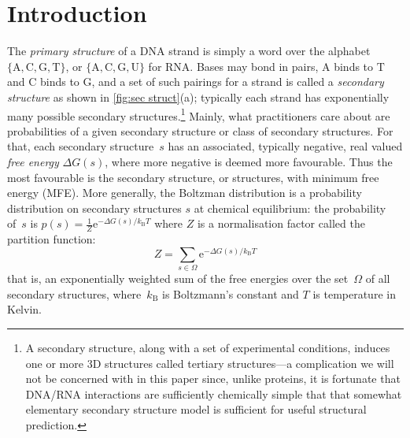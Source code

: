 

\newcommand{\base}[1]{\ensuremath{\mathrm{#1}}\xspace}
\newcommand{\baseA}{\base{A}}
\newcommand{\baseT}{\base{T}}
\newcommand{\baseG}{\base{G}}
\newcommand{\baseC}{\base{C}}
\newcommand{\baseU}{\base{U}}

\section{Introduction}

The  {\em primary structure} of a DNA strand is simply a word   over the alphabet  $\{\baseA, \baseC, \baseG, \baseT\}$, or  $\{\baseA, \baseC, \baseG, \baseU\}$ for RNA.  
Bases may bond in pairs, \baseA binds to \baseT and \baseC binds to \baseG, and a set of such pairings for a strand is called a {\em secondary structure} as shown in {\cref{fig:sec struct}(a)}; typically each strand has exponentially many possible secondary structures.\footnote{A secondary structure, along with a set of experimental conditions,  induces one or more 3D structures called tertiary structures---a complication we will not be concerned with in this paper since, unlike proteins, it is fortunate that DNA/RNA interactions are sufficiently chemically simple that that somewhat elementary secondary structure model is sufficient for useful structural prediction.} 
Mainly, what practitioners care about are probabilities of a given secondary structure or class of secondary structures. 
For that, each secondary structure~$s$ has an associated, typically negative, real valued {\em free energy} $\Delta G(s)$, where more negative is deemed more favourable.  
Thus the most favourable is the secondary structure, or structures, with minimum free energy (MFE). 
More generally, the Boltzman distribution is  a probability distribution on secondary structures $s$ at chemical equilibrium:  
the probability of~$s$ is  $p(s) = \frac{1}{Z} \mathrm{e}^{- \Delta G(s)/k_\mathrm{B}T}  $ where $Z$ is a normalisation factor called the partition function: 
\begin{equation}\label{eq:pf}
	Z  = \sum_{s\in\Omega} \mathrm{e}^{- \Delta G(s)/k_\mathrm{B}T} 
\end{equation}
that is, an exponentially weighted sum of the free energies over the set~$\Omega$ of all secondary structures, 
where~$k_\mathrm{B}$ is Boltzmann's constant and $T$ is temperature in Kelvin. 

